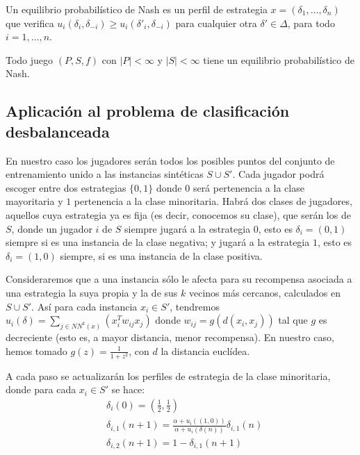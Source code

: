 \begin{definition}
Un equilibrio probabilístico de Nash es un perfil de estrategia $x = (\delta_1, \ldots, \delta_n)$ que verifica 
$u_i(\delta_i, \delta_{-i}) \ge u_i(\delta'_{i}, \delta_{-i})$ para cualquier otra $\delta'\in \Delta$, para todo $i=1, \ldots, n$.
\end{definition}

\begin{theorem}
 Todo juego $(P,S,f)$ con $|P| < \infty$ y $|S| < \infty$ tiene un equilibrio probabilístico de Nash.
\end{theorem}

\subsection{Aplicación al problema de clasificación desbalanceada}
En nuestro caso los jugadores serán todos los posibles puntos del conjunto de entrenamiento unido a las instancias 
sintéticas $S \cup S'$. Cada jugador podrá escoger entre dos estrategias $\{0,1\}$ donde $0$ será pertenencia a la clase 
mayoritaria y $1$ pertenencia a la clase minoritaria. Habrá dos clases de jugadores, aquellos cuya estrategia ya es fija (es
decir, conocemos su clase), que serán los de $S$, donde un jugador $i$ de $S$ siempre jugará a la estrategia $0$, esto es 
$\delta_i = (0,1)$ siempre si es una instancia de la clase negativa; y jugará a la estrategia $1$, esto es 
$\delta_i = (1,0)$ siempre, si es una instancia de la clase positiva.

Consideraremos que a una instancia sólo le afecta para su recompensa asociada a una estrategia la suya propia y la de sus
$k$ vecinos más cercanos, calculados en $S\cup S'$. Así para cada instancia $x_i \in S'$, tendremos $u_i(\delta) = \sum_{j\in NN^k(x)} (x_i^T w_{ij} x_j)$ donde
$w_{ij} = g\left(d(x_i, x_j)\right)$ tal que $g$ es decreciente (esto es, a mayor distancia, menor recompensa). En nuestro
caso, hemos tomado $g(z) = \frac{1}{1+z^2}$, con $d$ la distancia euclídea.

A cada paso se actualizarán los perfiles de estrategia de la clase minoritaria, donde para cada $x_i\in S'$ se hace: 
\begin{align*}
& \delta_i(0) = \left(\frac{1}{2}, \frac{1}{2}\right)\\
& \delta_{i,1}(n+1) = \frac{\alpha + u_i((1,0))}{\alpha + u_i(\delta(n))} \delta_{i,1}(n)\\
& \delta_{i,2}(n+1) = 1 - \delta_{i,1}(n+1)
\end{align*}

